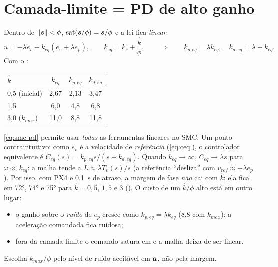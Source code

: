 \section{Camada-limite = PD de alto ganho}
Dentro de $\lVert\bm{s}\rVert<\phi$, $\operatorname{sat}(\bm{s}/\phi)=\bm{s}/\phi$ e a lei fica
\emph{linear}:
\begin{equation}
  u = -\lambda e_v - k_{eq}(e_v+\lambda e_p),\qquad k_{eq}=k_s+\frac{\hat k}{\phi},
  \qquad\Longrightarrow\qquad
  k_{p,eq} = \lambda k_{eq},\quad k_{d,eq}=\lambda + k_{eq}.
  \label{eq:smc-pd}
\end{equation}
Com o :
\begin{center}
\begin{tabular}{@{}lccc@{}}
\toprule
$\hat k$ & $k_{eq}$ & $k_{p,eq}$ & $k_{d,eq}$ \\
\midrule
0,5 (inicial) & 2,67 & 2,13 & 3,47 \\
1,5 & 6,0 & 4,8 & 6,8 \\
3,0 ($k_{max}$) & 11,0 & 8,8 & 11,8 \\
\bottomrule
\end{tabular}
\end{center}
\begin{atencao}
\eqref{eq:smc-pd} permite usar \emph{todas} as ferramentas lineares no SMC. Um ponto
contraintuitivo: como $e_v$ é a velocidade de \emph{referência} (\cref{eq:ceq}), o
controlador equivalente é $C_{eq}(s)=k_{p,eq}s/(s+k_{d,eq})$. Quando $k_{eq}\to\infty$,
$C_{eq}\to\lambda s$ para $\omega\ll k_{eq}$: a malha tende a $L\approx\lambda T_v(s)/s$
(a referência ``desliza'' com $v_{ref}\approx-\lambda e_p$). Por isso, com PX4 e
\SI{0,1}{s} de atraso, a margem de fase \emph{não} cai com $\hat k$: ela fica em
\ang{72}, \ang{74} e \ang{75} para $\hat k=0{,}5$, $1{,}5$ e $3$
(). O custo de um $\hat k/\phi$ alto está em outro lugar:
\begin{itemize}
  \item o ganho sobre o \emph{ruído} de $e_p$ cresce como $k_{p,eq}=\lambda k_{eq}$
        (8,8 com $k_{max}$): a aceleração comandada fica ruidosa;
  \item fora da camada-limite o comando satura em  e a malha deixa de
        ser linear.
\end{itemize}
Escolha $k_{max}/\phi$ pelo nível de ruído aceitável em $\bm{a}$, não pela margem.
\end{atencao}

